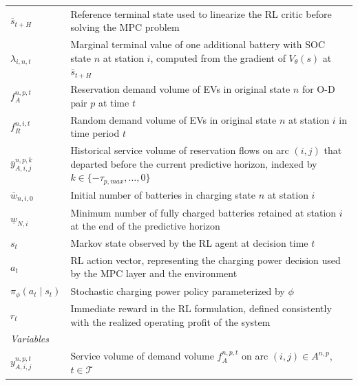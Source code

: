 \documentclass[12pt,hyperref,a4paper,UTF8]{ctexart}
\begin{document}
\begin{table}[!htbp]
\begin{tabular}{@{}lp{13cm}@{}}
    $\bar{s}_{t+H}$ & Reference terminal state used to linearize the RL critic before solving the MPC problem \\
    $\lambda_{i,n,t}$ & Marginal terminal value of one additional battery with SOC state $n$ at station $i$, computed from the gradient of $V_{\theta}(s)$ at $\bar{s}_{t+H}$ \\
    $f_A^{n,p,t}$ & Reservation demand volume of EVs in original state $n$ for O-D pair $p$ at time $t$ \\
    $f_{R}^{n,i,t}$ & Random demand volume of EVs in original state $n$ at station $i$ in time period $t$ \\
    $\bar{y}_{A,i,j}^{n,p,k}$ & Historical service volume of reservation flows on arc $(i,j)$ that departed before the current predictive horizon, indexed by $k\in\{-\tau_{p,max},\dots,0\}$ \\
    $\bar{w}_{n,i,0}$ & Initial number of batteries in charging state $n$ at station $i$ \\
    $\underline{w}_{N,i}$ & Minimum number of fully charged batteries retained at station $i$ at the end of the predictive horizon \\
    $s_t$ & Markov state observed by the RL agent at decision time $t$ \\
    $a_t$ & RL action vector, representing the charging power decision used by the MPC layer and the environment \\
    $\pi_{\phi}(a_t\mid s_t)$ & Stochastic charging power policy parameterized by $\phi$ \\
    $r_t$ & Immediate reward in the RL formulation, defined consistently with the realized operating profit of the system \\
    \midrule
    \multicolumn{2}{l}{\textit{Variables}} \\
    $y_{A,i,j}^{n,p,t}$ & Service volume of demand volume $f_{A}^{n,p,t}$ on arc $(i,j) \in A^{n,p}$, $t\in\mathcal{T}$ \\

\end{tabular}
\end{table}
\end{document}
